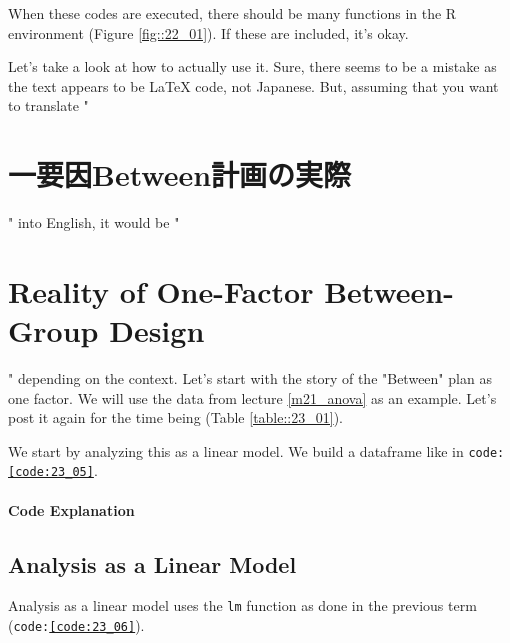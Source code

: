 \documentclass{ltjbook}
\begin{document}
When these codes are executed, there should be many functions in the R environment (Figure \ref{fig::22_01}). If these are included, it's okay.

Let's take a look at how to actually use it.
Sure, there seems to be a mistake as the text appears to be LaTeX code, not Japanese. But, assuming that you want to translate "\section{一要因Between計画の実際}" into English, it would be "\section{Reality of One-Factor Between-Group Design}" depending on the context.
Let's start with the story of the "Between" plan as one factor. We will use the data from lecture \ref{m21_anova} as an example. Let's post it again for the time being (Table \ref{table::23_01}).

We start by analyzing this as a linear model. We build a dataframe like in \texttt{code:\ref{code:23_05}}.



\paragraph{Code Explanation}


\subsection{Analysis as a Linear Model}
Analysis as a linear model uses the \texttt{lm} function as done in the previous term (\texttt{code:\ref{code:23_06}}).
\end{document}
